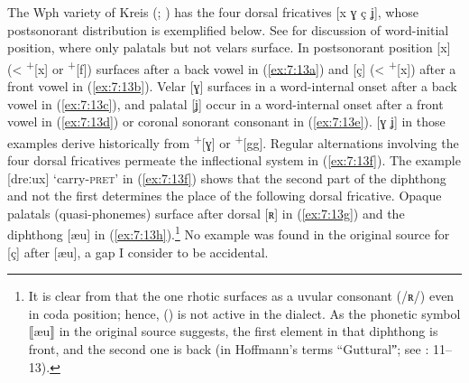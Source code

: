 The Wph variety of Kreis  (\citealt{Hoffmann1887}; ) has the four dorsal fricatives [x ɣ ç ʝ], whose postsonorant distribution is exemplified below. See  for discussion of word-initial position, where only palatals but not velars surface. In postsonorant position [x] (< \textsuperscript{+}[x] or \textsuperscript{+}[f]) surfaces after a back vowel in (\ref{ex:7:13a}) and [ç] (< \textsuperscript{+}[x]) after a front vowel in (\ref{ex:7:13b}). Velar [ɣ] surfaces in a word-internal onset after a back vowel in (\ref{ex:7:13c}), and palatal [ʝ] occur in a word-internal onset after a front vowel in (\ref{ex:7:13d}) or coronal sonorant consonant in (\ref{ex:7:13e}). [ɣ ʝ] in those examples derive historically from  \textsuperscript{+}[ɣ] or \textsuperscript{+}[gg]. Regular alternations involving the four dorsal fricatives permeate the inflectional system in (\ref{ex:7:13f}). The example [dreːux] ‘carry\textsc{{}-pret}’ in (\ref{ex:7:13f}) shows that the second part of the diphthong and not the first determines the place of the following dorsal fricative. Opaque palatals (quasi-phonemes) surface after dorsal [ʀ] in (\ref{ex:7:13g}) and the diphthong [æu] in (\ref{ex:7:13h}).\footnote{{It is clear from \citet[5]{Hoffmann1887} that the one rhotic surfaces as a uvular consonant (/ʀ/) even in coda position; hence,  () is not active in the dialect. As the phonetic symbol ⟦æu⟧ in the original source suggests, the first element in that diphthong is front, and the second one is back (in Hoffmann’s terms “Gutturalˮ; see \citealt{Hoffmann1887}: 11--13).} } No example was found in the original source for [ç] after [æu], a gap I consider to be accidental.

